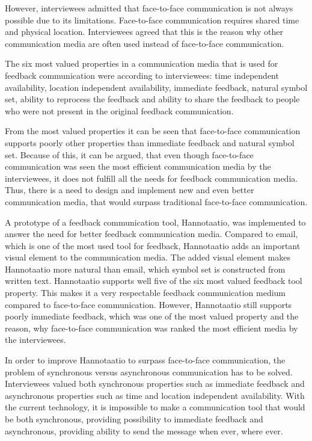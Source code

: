 \documentclass[english,12pt,a4paper,pdftex]{article}
\begin{document}
However, interviewees admitted that face-to-face communication is not always possible due to its limitations. Face-to-face communication requires shared time and physical location. Interviewees agreed that this is the reason why other communication media are often used instead of face-to-face communication.

The six most valued properties in a communication media that is used for feedback communication were according to interviewees: time independent availability, location independent availability, immediate feedback, natural symbol set, ability to reprocess the feedback and ability to share the feedback to people who were not present in the original feedback communication.

From the most valued properties it can be seen that face-to-face communication supports poorly other properties than immediate feedback and natural symbol set. Because of this, it can be argued, that even though face-to-face communication was seen the most efficient communication media by the interviewees, it does not fulfill all the needs for feedback communication media. Thus, there is a need to design and implement new and even better communication media, that would surpass traditional face-to-face communication.

A prototype of a feedback communication tool, Hannotaatio, was implemented to answer the need for better feedback communication media. Compared to email, which is one of the most used tool for feedback, Hannotaatio adds an important visual element to the communication media. The added visual element makes Hannotaatio more natural than email, which symbol set is constructed from written text. Hannotaatio supports well five of the six most valued feedback tool property. This makes it a very respectable feedback communication medium compared to face-to-face communication. However, Hannotaatio still supports poorly immediate feedback, which was one of the most valued property and the reason, why face-to-face communication was ranked the most efficient media by the interviewees.

In order to improve Hannotaatio to surpass face-to-face communication, the problem of synchronous versus asynchronous communication has to be solved. Interviewees valued both synchronous properties such as immediate feedback and asynchronous properties such as time and location independent availability. With the current technology, it is impossible to make a communication tool that would be both synchronous, providing possibility to immediate feedback and asynchronous, providing ability to send the message when ever, where ever.
\end{document}
